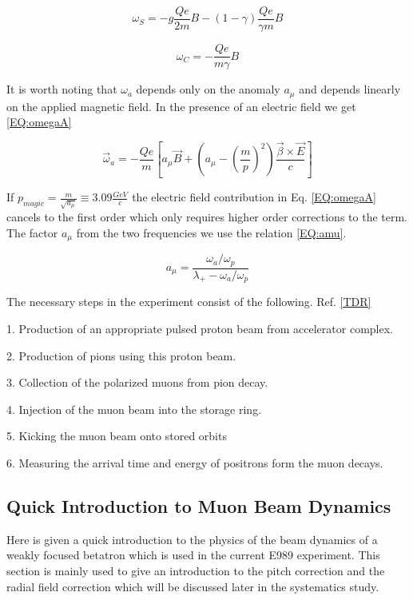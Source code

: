 \documentclass[./Thesis]{subfiles}
\begin{document}
	\begin{equation}\label{EQ:omegaS}
	\omega_{S} = -g \frac{Qe}{2m} B - (1-\gamma)\frac{Qe}{\gamma m} B
	\end{equation}

	\begin{equation}\label{EQ:omegaC}
	\omega_C = - \frac{Qe}{m\gamma} B
	\end{equation}

It is worth noting that $\omega_a$ depends only on the anomaly $a_\mu$ and depends linearly on the applied magnetic field.  In the presence of an electric field we get \ref{EQ:omegaA}

\begin{equation}\label{EQ:omegaA}
\vec{\omega}_a = -\frac{Qe}{m}[a_{\mu} \vec{B} + (a_{\mu} - (\frac{m}{p})^2) \frac{\vec{\beta} \times \vec{E}}{c}]
\end{equation}


If $p_{magic} = \frac{m}{\sqrt{a_\mu}} \equiv 3.09 \frac{GeV}{c}$ the electric field contribution in Eq. \ref{EQ:omegaA} cancels to the first order which only requires higher order corrections to the term. The factor $a_\mu$ from the two frequencies we use the relation \ref{EQ:amu}.

\begin{equation}\label{EQ:amu}
a_\mu = \frac{\omega_a / \omega_p}{\lambda_{+} - \omega_a / \omega_p}
\end{equation}

The necessary steps in the experiment consist of the following.  Ref. \ref{TDR}


1.	Production of an appropriate pulsed proton beam from accelerator complex.

2.	Production of pions using this proton beam.

3. 	Collection of the polarized muons from pion decay.

4. 	Injection of the muon beam into the storage ring.

5. 	Kicking the muon beam onto stored orbits

6.	Measuring the arrival time and energy of positrons form the muon decays.


\vspace{5mm}

\subsection{Quick Introduction to Muon Beam Dynamics}

	Here is given a quick introduction to the physics of the beam dynamics of a weakly focused betatron which is used in the current E989 experiment.  This section is mainly used to give an introduction to the pitch correction and the radial field correction which will be discussed later in the systematics study. 
\end{document}
